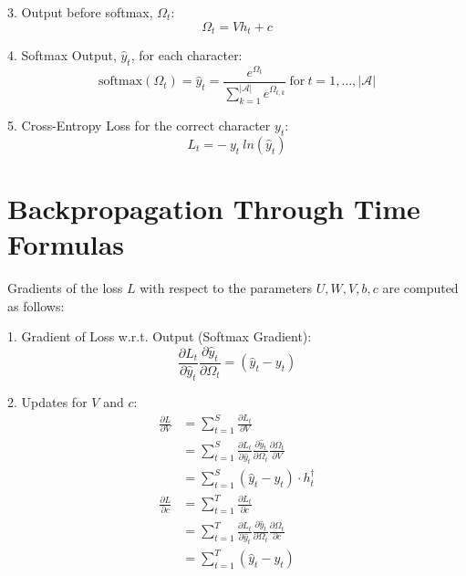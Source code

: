 \documentclass{article}
\begin{document}
3. Output before softmax, $\Omega_t$:
$$
\Omega_t = Vh_t + c
$$

4. Softmax Output, $\hat{y}_t$, for each character:
$$
\text{softmax} (\Omega_{t})=\hat{y}_{t}=\frac{e^{\Omega_t}}{\sum_{k=1}^{|\mathcal{A}|} e^{\Omega_{t,k}}} ~\text{for}~ t=1, \ldots, |\mathcal{A}|
$$

5. Cross-Entropy Loss for the correct character $y_{t}$:
$$
L_t = -~y_t~ln(\hat{y}_t)
$$
\section{Backpropagation Through Time Formulas}

Gradients of the loss $L$ with respect to the parameters $U, W, V, b, c$ are computed as follows:

1. Gradient of Loss w.r.t. Output (Softmax Gradient):
$$\label{eqn:partial_aV}
\frac{\partial L_t}{\partial \hat{y}_t}\frac{\partial \hat{y}_t}{\partial \Omega_t} = (\hat{y}_{t}-y_{t})
$$

2. Updates for $V$ and $c$:
\begin{align*} 
\frac{\partial L}{\partial V} &= \sum_{t=1}^{S} \frac{\partial L_{t}}{\partial V} \\
&= \sum_{t=1}^{S} \frac{\partial L_{t}}{\partial \hat{y}_{t}} \frac{\partial \hat{y}_{t}}{\partial \Omega_{t}} \frac{\partial \Omega_{t}}{\partial V}\\
&=\sum_{t=1}^{S} (\hat{y}_{t} - y_{t}) \cdot h_{t}^\dagger\\
\frac{\partial L}{\partial c} &= \sum_{t=1}^{T} \frac{\partial L_t}{\partial c} \\
&= \sum_{t=1}^{T} \frac{\partial L_{t}}{\partial \hat{y}_{t}} \frac{\partial \hat{y}_{t}}{\partial \Omega_{t}} \frac{\partial \Omega_{t}}{\partial c}\\
 &=\sum_{t=1}^{T} (\hat{y}_{t} - y_{t})
\end{align*}
\end{document}
